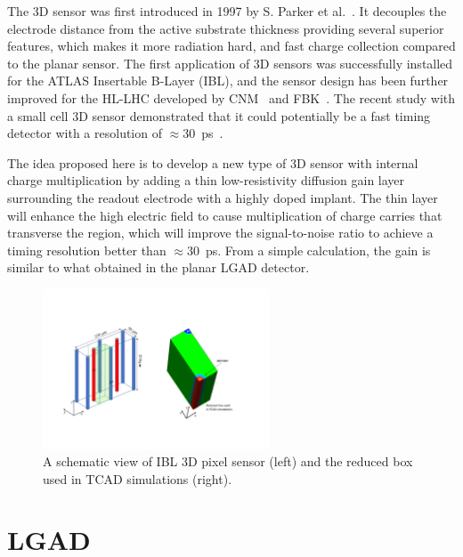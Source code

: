 \documentclass[aps,pt14,superscriptaddress,showpacs,floatfix,nofootinbib]{revtex4}
\begin{document}
The 3D sensor was first introduced in 1997 by S. Parker et al.~\cite{Parker:1996dx}.
It decouples the electrode distance from the active substrate
thickness providing several superior features, which makes it more radiation hard,
and fast charge collection compared to the planar sensor.
The first application of 3D sensors was successfully installed for
the ATLAS Insertable B-Layer (IBL), and the sensor design has been
further improved for the HL-LHC developed by CNM~\cite{Pellegrini:2008zza}
and FBK~\cite{Sultan:2016vzg}.
The recent study with a small cell 3D sensor demonstrated that it
could potentially be a fast timing detector with a resolution
of $\approx$30~ps~\cite{Kramberger:2019ygz}.

The idea proposed here is to develop a new type of 3D sensor with internal
charge multiplication by adding a thin low-resistivity diffusion gain layer surrounding
the readout electrode with a highly doped implant.
The thin layer will enhance the high electric field to cause multiplication of
charge carries that transverse the region, which will improve the signal-to-noise ratio to
achieve a timing resolution better than $\approx$30~ps.
From a simple calculation, the gain is similar to what obtained
in the planar LGAD detector.

\begin{figure}[h!]
\begin{center}
\includegraphics[width=0.60\textwidth,keepaspectratio]{figures1/IBL3D_GL.pdf}
\caption{A schematic view of IBL 3D pixel sensor (left) and the reduced box used in TCAD simulations 
(right).\label{fig:ibl-3d}}
\end{center}
\end{figure}

\section{LGAD}
\end{document}
